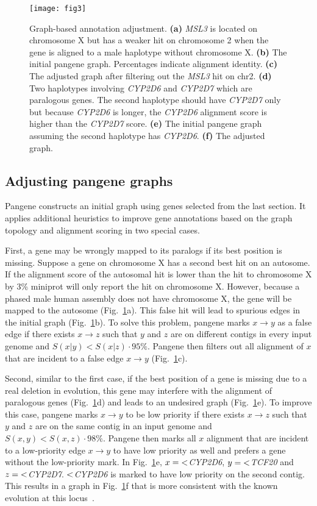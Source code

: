 \documentclass[webpdf,contemporary,large,namedate]{oup-authoring-template}%
\begin{document}
\begin{figure}[tb!]
\centering
\texttt{[image: fig3]}
\caption{Graph-based annotation adjustment.
{\bf (a)} \emph{MSL3} is located on chromosome X but has a weaker hit on chromosome 2 when the gene
is aligned to a male haplotype without chromosome X.
{\bf (b)} The initial pangene graph. Percentages indicate alignment identity.
{\bf (c)} The adjusted graph after filtering out the \emph{MSL3} hit on chr2.
{\bf (d)} Two haplotypes involving \emph{CYP2D6} and \emph{CYP2D7} which are paralogous genes.
The second haplotype should have \emph{CYP2D7} only but because \emph{CYP2D6} is longer, the \emph{CYP2D6} alignment score is higher than the \emph{CYP2D7} score.
{\bf (e)} The initial pangene graph assuming the second haplotype has \emph{CYP2D6}.
{\bf (f)} The adjusted graph.
}\label{fig:resolve}
\end{figure}

\subsection{Adjusting pangene graphs}

Pangene constructs an initial graph using genes selected from the last section.
It applies additional heuristics to improve gene annotations based on the graph topology and alignment scoring
in two special cases.

First, a gene may be wrongly mapped to its paralogs if its best position is missing.
Suppose a gene on chromosome X has a second best hit on an autosome.
If the alignment score of the autosomal hit is lower than the hit to chromosome X by 3\%
miniprot will only report the hit on chromosome X.
However, because a phased male human assembly does not have chromosome X,
the gene will be mapped to the autosome (Fig.~\ref{fig:resolve}a).
This false hit will lead to spurious edges in the initial graph (Fig.~\ref{fig:resolve}b).
To solve this problem, pangene marks $x\to y$ as a false edge
if there exists $x\to z$ such that $y$ and $z$ are on different contigs in every input genome and $S(x|y)<S(x|z)\cdot 95\%$.
Pangene then filters out all alignment of $x$ that are incident to a false edge $x\to y$ (Fig.~\ref{fig:resolve}c).

Second, similar to the first case, if the best position of a gene is missing due to a real deletion in evolution,
this gene may interfere with the alignment of paralogous genes (Fig.~\ref{fig:resolve}d)
and leads to an undesired graph (Fig.~\ref{fig:resolve}e).
To improve this case, pangene marks $x\to y$ to be low priority
if there exists $x\to z$ such that $y$ and $z$ are on the same contig in an input genome and $S(x,y)<S(x,z)\cdot 98\%$.
Pangene then marks all $x$ alignment that are incident to a low-priority edge $x\to y$ to have low priority as well
and prefers a gene without the low-priority mark.
In Fig.~\ref{fig:resolve}e, $x={\rm <}$\emph{CYP2D6}, $y={\rm <}$\emph{TCF20} and $z={\rm <}$\emph{CYP2D7}.
${\rm <}$\emph{CYP2D6} is marked to have low priority on the second contig.
This results in a graph in Fig.~\ref{fig:resolve}f that is more consistent with the known evolution at this locus~\citep{Liao:2023aa}.
\end{document}
